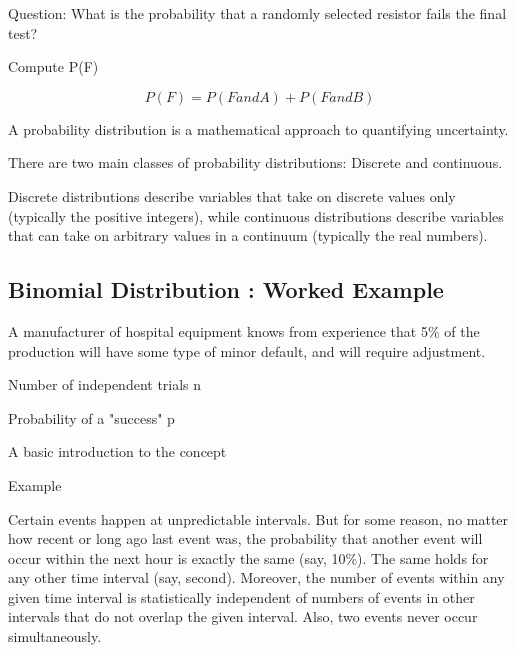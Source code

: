 \documentclass[12pt]{report}
\begin{document}
{{	%
	
	
	Question: What is the probability that a randomly selected resistor fails the final test?
	
	Compute P(F) 

\[	P(F) = P(FandA) + P(FandB)\]
	






A probability distribution is a mathematical approach to quantifying uncertainty.

There are two main classes of probability distributions: Discrete and continuous. 

Discrete distributions describe variables that take on discrete values only (typically the positive integers), while continuous 
distributions describe variables that can take on arbitrary values in a continuum (typically the real numbers).














\subsection*{Binomial Distribution : Worked Example}

A manufacturer of hospital equipment knows from experience that 5\% of the production will have some type of minor default, and will require adjustment.

Number of independent trials    n

Probability of a "success" p







A basic introduction to the concept

Example

Certain events happen at unpredictable intervals. But for some reason, no matter how recent or long ago last event was, the probability that another event will occur within the next hour is exactly the same (say, 10\%). The same holds for any other time interval (say, second). Moreover, the number of events within any given time interval is statistically independent of numbers of events in other intervals that do not overlap the given interval. Also, two events never occur simultaneously.

}}
\end{document}
